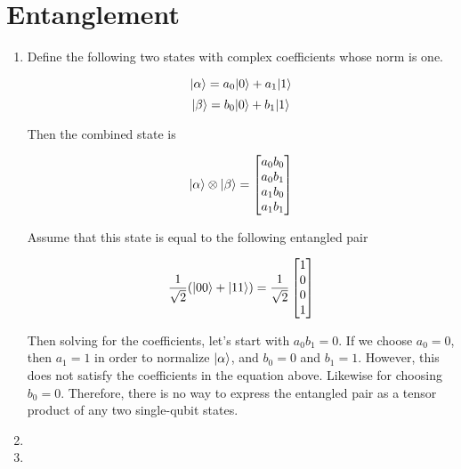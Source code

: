 \documentclass[12pt]{article}
\begin{document}
\pagebreak

\section{Entanglement}

\begin{enumerate}

\item
Define the following two states with complex coefficients whose norm is one.

\begin{equation*}
|\alpha \rangle = a_0|0 \rangle + a_1|1 \rangle
\end{equation*}
\begin{equation*}
|\beta \rangle = b_0|0 \rangle + b_1|1 \rangle
\end{equation*}

Then the combined state is

\begin{equation*}
|\alpha \rangle \otimes |\beta \rangle =
\begin{bmatrix}
a_0 b_0\\
a_0 b_1\\
a_1 b_0\\
a_1 b_1\\
\end{bmatrix}
\end{equation*}

Assume that this state is equal to the following entangled pair

\begin{equation*}
\frac{1}{\sqrt{2}}(|00 \rangle + |11 \rangle)
=
\frac{1}{\sqrt{2}}
\begin{bmatrix}
1\\
0\\
0\\
1\\
\end{bmatrix}
\end{equation*}

Then solving for the coefficients, let's start with $a_0 b_1 = 0$.
If we choose $a_0 = 0$, then $a_1 = 1$ in
order to normalize $|\alpha \rangle$, and $b_0 = 0$ and $b_1 = 1$. However, this
does not satisfy the coefficients in the equation above. Likewise for choosing
$b_0 = 0$. Therefore, there is no way to express the entangled pair as
a tensor product of any two single-qubit states.

\item

\item

\end{enumerate}
\end{document}

